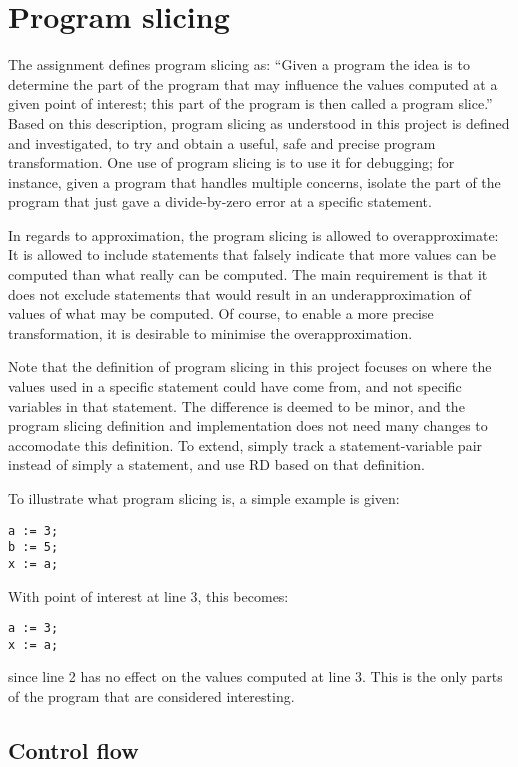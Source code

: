 \section{Program slicing}

The assignment defines program slicing as:
``Given a program the idea is to determine the part of the program that may influence the values
computed at a given point of interest; this part of the program is then called a program slice.''
Based on this description, program slicing as understood in this project is defined and investigated,
to try and obtain a useful, safe and precise program transformation.
One use of program slicing is to use it for debugging; for instance, given a program that handles
multiple concerns, isolate the part of the program that just gave a divide-by-zero error at a
specific statement.

In regards to approximation, the program slicing is allowed to overapproximate: It is allowed to include statements
that falsely indicate that more values can be computed than what really can be computed.
The main requirement is that it does not exclude statements that would result in an underapproximation
of values of what may be computed. Of course, to enable a more precise transformation, it is desirable
to minimise the overapproximation.

Note that the definition of program slicing in this project focuses on
where the values used in a specific statement could have come from, and not
specific variables in that statement. The difference is deemed to be minor, and the
program slicing definition and implementation does not need many
changes to accomodate this definition. To extend, simply track a statement-variable
pair instead of simply a statement, and use RD based on that definition.

To illustrate what program slicing is, a simple example is given:
\begin{lstlisting}
a := 3;
b := 5;
x := a;
\end{lstlisting}
With point of interest at line 3, this becomes:
\begin{lstlisting}
a := 3;
x := a;
\end{lstlisting}
since line 2 has no effect on the values computed at line 3.
This is the only parts of the program that are considered interesting.

\subsection{Control flow}

